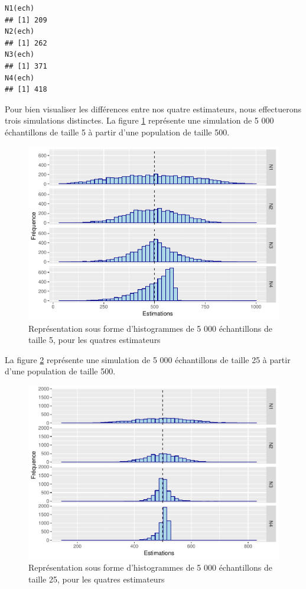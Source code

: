 \documentclass[10pt]{article}
\begin{document}
\begin{verbatim}
N1(ech)
## [1] 209
N2(ech)
## [1] 262
N3(ech)
## [1] 371
N4(ech)
## [1] 418
\end{verbatim}

Pour bien visualiser les différences entre nos quatre estimateurs, nous
effectuerons trois simulations distinctes. La figure
\ref{fig:ech-taille-5} représente une simulation de 5 000 échantillons
de taille 5 à partir d'une population de taille 500.

\begin{figure}

{\centering \includegraphics[width=0.9\linewidth]{serial_number_amq_files/figure-latex/ech-taille-5-1} 

}

\caption{Représentation sous forme d'histogrammes de 5 000 échantillons de taille 5, pour les quatres estimateurs}\label{fig:ech-taille-5}
\end{figure}

La figure \ref{fig:ech-taille-25} représente une simulation de 5 000
échantillons de taille 25 à partir d'une population de taille 500.

\begin{figure}

{\centering \includegraphics[width=0.9\linewidth]{serial_number_amq_files/figure-latex/ech-taille-25-1} 

}

\caption{Représentation sous forme d'histogrammes de 5 000 échantillons de taille 25, pour les quatres estimateurs}\label{fig:ech-taille-25}
\end{figure}
\end{document}
